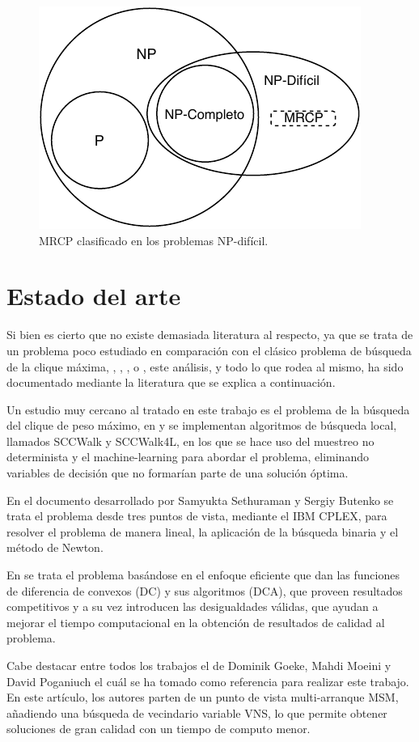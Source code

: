 \begin{figure}[H]
	\centering
	\includegraphics{Figures/problemas-np-hard.pdf}
	\caption{MRCP clasificado en los problemas NP-difícil.}
	\label{fig:np-dificil}
\end{figure}

\section{Estado del arte}
Si bien es cierto que no existe demasiada literatura al respecto, ya que se trata de un problema poco estudiado en comparación con el clásico problema de búsqueda de la clique máxima, \cite{mcp-batsyn}, \cite{mcp-ryp}, \cite{mcp-neuro}, o \cite{mcp-ants}, este análisis, y todo lo que rodea al mismo, ha sido documentado mediante la literatura que se explica a continuación. 

Un estudio muy cercano al tratado en este trabajo es el problema de la búsqueda del clique de peso máximo, en \cite{mwcp-ls} y \cite{mwcp-ml} se implementan algoritmos de búsqueda local, llamados SCCWalk y SCCWalk4L, en los que se hace uso del muestreo no determinista y el machine-learning para abordar el problema, eliminando variables de decisión que no formarían parte de una solución óptima.

En el documento desarrollado por Samyukta Sethuraman y Sergiy Butenko \cite{mrcp-Sethuraman:2015} se trata el problema desde tres puntos de vista, mediante el IBM CPLEX, para resolver el problema de manera lineal, la aplicación de la búsqueda binaria y el método de Newton.

En \cite{mrcp-moeni} se trata el problema basándose en el enfoque eficiente que dan las funciones de diferencia de convexos (DC) y sus algoritmos (DCA), que proveen resultados competitivos y a su vez introducen las desigualdades válidas, que ayudan a mejorar el tiempo computacional en la obtención de resultados de calidad al problema.

Cabe destacar entre todos los trabajos el de Dominik Goeke, Mahdi Moeini y David Poganiuch \cite{mrcp-GOEKE2017283} el cuál se ha tomado como referencia para realizar este trabajo. En este artículo, los autores parten de un punto de vista multi-arranque \gls{MSM}, añadiendo una búsqueda de vecindario variable \gls{VNS}, lo que permite obtener soluciones de gran calidad con un tiempo de computo menor.


